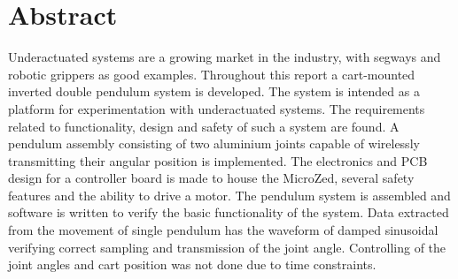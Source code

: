 \section*{Abstract}
Underactuated systems are a growing market in the industry, with segways and robotic grippers as good examples.
Throughout this report a cart-mounted inverted double pendulum system is developed.
The system is intended as a platform for experimentation with underactuated systems.
The requirements related to functionality, design and safety of such a system are found.
A pendulum assembly consisting of two aluminium joints capable of wirelessly transmitting their angular position is implemented.
The electronics and PCB design for a controller board is made to house the MicroZed, several safety features and the ability to drive a motor.
The pendulum system is assembled and software is written to verify the basic functionality of the system.
Data extracted from the movement of single pendulum has the waveform of damped sinusoidal verifying correct sampling and transmission of the joint angle.
Controlling of the joint angles and cart position was not done due to time constraints.